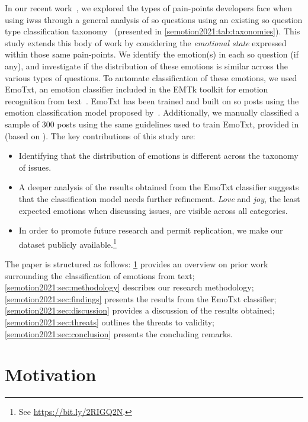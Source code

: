In our recent work~\citep{Cummaudo:2020icse}, we explored the types of pain-points developers face when using \glspl{iws} through a general analysis of \SEMNumTotalPostsFromSO{} \gls{so} questions using an existing \gls{so} question type classification taxonomy~\citep{Beyer:2018fm} (presented in \cref{semotion2021:tab:taxonomies}). This study extends this body of work by considering the \textit{emotional state} expressed within those same pain-points. We identify the emotion(s) in each \gls{so} question (if any), and investigate if the distribution of these emotions is similar across the various types of questions. To automate classification of these emotions, we used EmoTxt, an emotion classifier included in the EMTk toolkit for emotion recognition from text~\citep{novielli2018, calefato2018, calefato2017}. EmoTxt has been trained and built on \gls{so} posts using the emotion classification model proposed by~\citet{shaver1987}. Additionally, we manually classified a sample of 300 posts using the same guidelines used to train EmoTxt, provided in \citep{novielli2018} (based on \citep{shaver1987}). The key contributions of this study are:

\begin{itemize}
    \item Identifying that the distribution of emotions is different across the taxonomy of issues.
    \item A deeper analysis of the results obtained from the EmoTxt classifier suggests that the classification model needs further refinement. \textit{Love} and \textit{joy}, the least expected emotions when discussing  issues, are visible across all categories.
    \item In order to promote future research and permit replication, we make our dataset publicly available.\footnote{See \url{https://bit.ly/2RIGQ2N}.}
\end{itemize}

The paper is structured as follows: \cref{semotion2021:sec:emotion-mining} provides an overview on prior work surrounding the classification of emotions from text; \cref{semotion2021:sec:methodology} describes our research methodology;  \cref{semotion2021:sec:findings} presents the results from the EmoTxt classifier;  \cref{semotion2021:sec:discussion} provides a discussion of the results obtained; 
\cref{semotion2021:sec:threats} outlines the threats to validity; \cref{semotion2021:sec:conclusion} presents the concluding remarks.  

\section{Motivation}\label{semotion2021:sec:emotion-mining}

